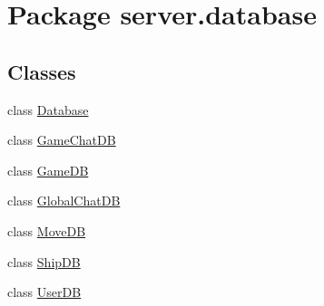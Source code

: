 \hypertarget{namespaceserver_1_1database}{}\section{Package server.\+database}
\label{namespaceserver_1_1database}
\subsection*{Classes}
\begin{DoxyCompactItemize}
\item 
class \hyperlink{classserver_1_1database_1_1_database}{Database}
\item 
class \hyperlink{classserver_1_1database_1_1_game_chat_d_b}{Game\+Chat\+DB}
\item 
class \hyperlink{classserver_1_1database_1_1_game_d_b}{Game\+DB}
\item 
class \hyperlink{classserver_1_1database_1_1_global_chat_d_b}{Global\+Chat\+DB}
\item 
class \hyperlink{classserver_1_1database_1_1_move_d_b}{Move\+DB}
\item 
class \hyperlink{classserver_1_1database_1_1_ship_d_b}{Ship\+DB}
\item 
class \hyperlink{classserver_1_1database_1_1_user_d_b}{User\+DB}
\end{DoxyCompactItemize}
